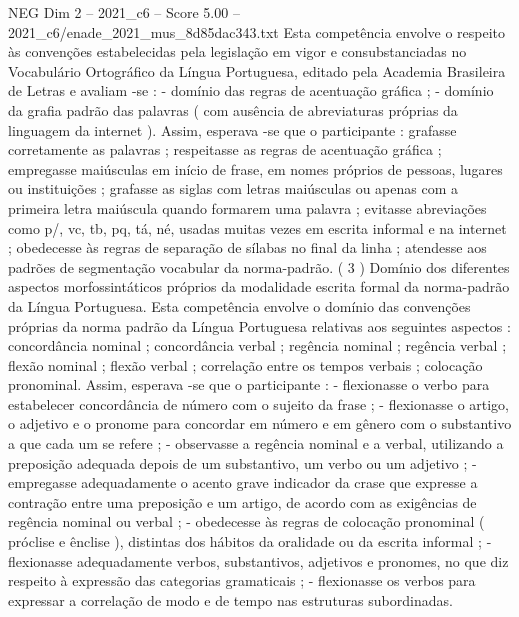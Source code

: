 \begin{textsample}{NEG Dim 2 – 2021\_c6 – Score 5.00 – 2021\_c6/enade\_2021\_mus\_8d85dac343.txt}
Esta competência envolve o respeito às convenções estabelecidas pela legislação em vigor e consubstanciadas no Vocabulário Ortográfico da Língua Portuguesa, editado pela Academia Brasileira de Letras e avaliam -se : - domínio das regras de acentuação gráfica ; - domínio da grafia padrão das palavras ( com ausência de abreviaturas próprias da linguagem da internet ).
Assim, esperava -se que o participante : grafasse corretamente as palavras ; respeitasse as regras de acentuação gráfica ; empregasse maiúsculas em início de frase, em nomes próprios de pessoas, lugares ou instituições ; grafasse as siglas com letras maiúsculas ou apenas com a primeira letra maiúscula quando formarem uma palavra ; evitasse abreviações como p/, vc, tb, pq, tá, né, usadas muitas vezes em escrita informal e na internet ; obedecesse às regras de separação de sílabas no final da linha ; atendesse aos padrões de segmentação vocabular da norma-padrão. ( 3 ) Domínio dos diferentes aspectos morfossintáticos próprios da modalidade escrita formal da norma-padrão da Língua Portuguesa.
Esta competência envolve o domínio das convenções próprias da norma padrão da Língua Portuguesa relativas aos seguintes aspectos : concordância nominal ; concordância verbal ; regência nominal ; regência verbal ; flexão nominal ; flexão verbal ; correlação entre os tempos verbais ; colocação pronominal.
Assim, esperava -se que o participante : - flexionasse o verbo para estabelecer concordância de número com o sujeito da frase ; - flexionasse o artigo, o adjetivo e o pronome para concordar em número e em gênero com o substantivo a que cada um se refere ; - observasse a regência nominal e a verbal, utilizando a preposição adequada depois de um substantivo, um verbo ou um adjetivo ; - empregasse adequadamente o acento grave indicador da crase que expresse a contração entre uma preposição e um artigo, de acordo com as exigências de regência nominal ou verbal ; - obedecesse às regras de colocação pronominal ( próclise e ênclise ), distintas dos hábitos da oralidade ou da escrita informal ; - flexionasse adequadamente verbos, substantivos, adjetivos e pronomes, no que diz respeito à expressão das categorias gramaticais ; - flexionasse os verbos para expressar a correlação de modo e de tempo nas estruturas subordinadas.

\end{textsample}
